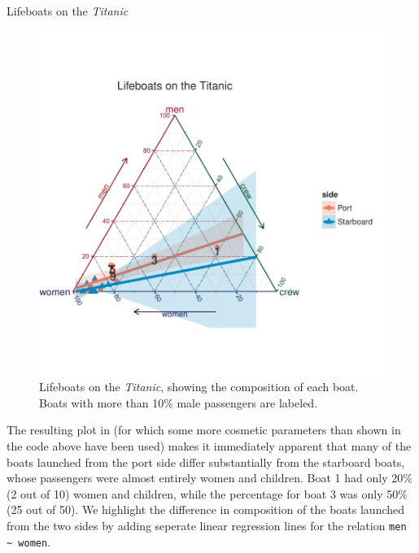 \documentclass[10pt,krantz2]{krantz}\usepackage[]{graphicx}\usepackage[]{color}
\newenvironment{knitrout}{}{} %
\renewenvironment{knitrout}{\small\renewcommand{\baselinestretch}{.85}}{} %
\begin{document}
\begin{Example}[lifeboat1]{Lifeboats on the \emph{Titanic}}
\begin{knitrout}
\begin{figure}[!htbp]
\centerline{\includegraphics[width=.7\textwidth,clip,trim=0 80 0 80]{ch04/fig/lifeboats1-1} }

\caption[Lifeboats on the Titanic]{Lifeboats on the \emph{Titanic}, showing the composition of each boat.  Boats with more than 10\% male passengers are labeled.}\label{fig:lifeboats1}
\end{figure}


\end{knitrout}
The resulting plot in  (for which some more cosmetic
parameters than shown in the code above have been used) makes it immediately apparent
that many of the boats launched from the port side differ substantially
from the starboard boats, whose passengers were almost entirely women
and children.  Boat 1 had only 20\% (2 out of 10) women and children, while the percentage for boat 3 was only 50\% (25 out of 50). We highlight the difference in
composition of the boats launched from the two sides by adding seperate linear regression lines
for the relation \verb|men ~ women|. 


\end{Example}
\end{document}
